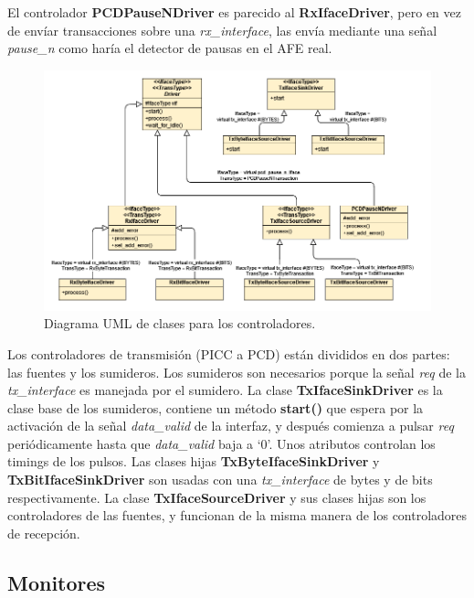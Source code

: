 \documentclass[a4paper, twoside, 11pt]{report}
\begin{document}
El controlador \textbf{PCDPauseNDriver} es parecido al \textbf{RxIfaceDriver}, pero en vez de envíar transacciones sobre una \textit{rx\_interface}, las envía mediante una señal \textit{pause\_n} como haría el detector de pausas en el AFE real.

\begin{figure}[htb]
  \centering
  \includegraphics[width=1.0\textwidth]{./img/drivers_uml.vpd}
  \caption{Diagrama UML de clases para los controladores.}
  \label{fig:driver_uml}
\end{figure}

Los controladores de transmisión (PICC a PCD) están divididos en dos partes: las fuentes y los sumideros. Los sumideros son necesarios porque la señal \textit{req} de la \textit{tx\_interface} es manejada por el sumidero. La clase \textbf{TxIfaceSinkDriver} es la clase base de los sumideros, contiene un método \textbf{start()} que espera por la activación de la señal \textit{data\_valid} de la interfaz, y después comienza a pulsar \textit{req} periódicamente hasta que \textit{data\_valid} baja a ‘0’. Unos atributos controlan los timings de los pulsos. Las clases hijas \textbf{TxByteIfaceSinkDriver} y \textbf{TxBitIfaceSinkDriver} son usadas con una \textit{tx\_interface} de bytes y de bits respectivamente. La clase \textbf{TxIfaceSourceDriver} y sus clases hijas son los controladores de las fuentes, y funcionan de la misma manera de los controladores de recepción.

\FloatBarrier
\subsection{Monitores}
\end{document}
